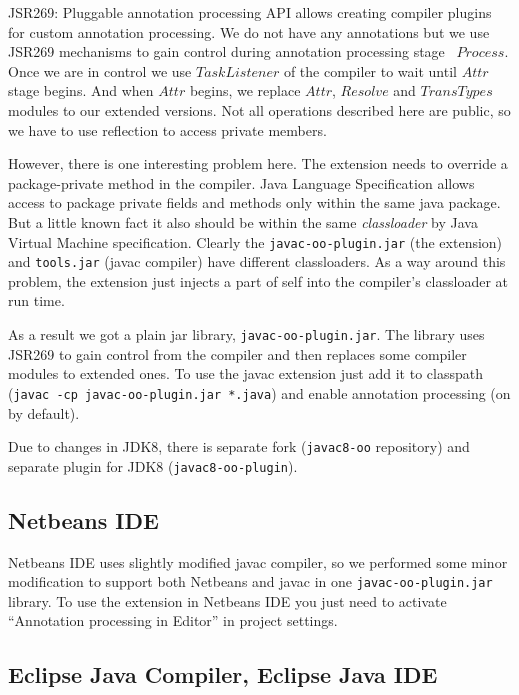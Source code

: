 \documentclass{aircc}
\begin{document}
JSR269: Pluggable annotation processing API\cite{jsr269} allows creating compiler plugins for custom annotation processing.
We do not have any annotations but we use JSR269 mechanisms to gain control during annotation processing stage \textemdash~$Process$.
Once we are in control we use $TaskListener$ of the compiler to wait until $Attr$ stage begins.
And when $Attr$ begins, we replace $Attr$, $Resolve$ and $TransTypes$ modules to our extended versions.
Not all operations described here are public, so we have to use reflection to access private members.

However, there is one interesting problem\cite{soPackagePrivate} here.
The extension needs to override a package-private method in the compiler.
Java Language Specification\cite{jls} allows access to package private fields and methods only within the same java package.
But a little known fact it also should be within the same \textit{classloader} by Java Virtual Machine specification\cite{jvmspecPP}. 
Clearly the \texttt{javac-oo-plugin.jar} (the extension) and \texttt{tools.jar} (javac compiler) have different classloaders.
As a way around this problem, the extension just injects a part of self into the compiler's classloader at run time\cite{soPackagePrivate}.

As a result we got a plain jar library, \texttt{javac-oo-plugin.jar}.
The library uses JSR269 to gain control from the compiler and then replaces some compiler modules to extended ones.
To use the javac extension just add it to classpath (\texttt{javac -cp javac-oo-plugin.jar *.java}) and enable annotation processing (on by default).

Due to changes in JDK8, there is separate fork (\texttt{javac8-oo} repository) and separate plugin for JDK8 (\texttt{javac8-oo-plugin}).



\subsection{Netbeans IDE}

Netbeans IDE uses slightly modified javac compiler, 
so we performed some minor modification to support both Netbeans and javac in one \texttt{javac-oo-plugin.jar} library.
To use the extension in Netbeans IDE you just need to activate ``Annotation processing in Editor'' in project settings.

\subsection{Eclipse Java Compiler, Eclipse Java IDE}
\end{document}
